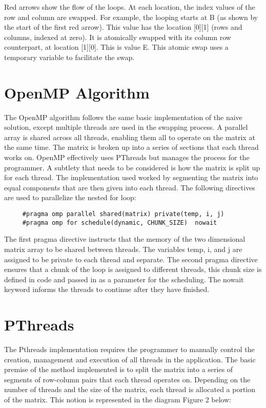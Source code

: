 \documentclass[10pt,onecolumn]{article}
\begin{document}
    \noindent Red arrows show the flow of the loops. At each location, the index values of the row and column are swapped. For example, the looping starts at B (as shown by the start of the first red arrow). This value has the location [0][1] (rows and columns, indexed at zero). It is atomically swapped with its column row counterpart, at location [1][0]. This is value E. This atomic swap uses a temporary variable to facilitate the swap.
    
    \section{OpenMP Algorithm}
    The OpenMP algorithm follows the same basic implementation of the naive solution, except multiple threads are used in the swapping process. A parallel array is shared across all threads, enabling them all to operate on the matrix at the same time. The matrix is broken up into a series of sections that each thread works on. OpenMP effectively uses PThreads but manages the process for the programmer. A subtlety that needs to be considered is how the matrix is split up for each thread. The implementation used worked by segmenting the matrix into equal components that are then given into each thread. The following directives are used to parallelize the nested for loop: 
    
    \begin{verbatim}
     #pragma omp parallel shared(matrix) private(temp, i, j)
     #pragma omp for schedule(dynamic, CHUNK_SIZE)  nowait
    \end{verbatim}
    
    \noindent The first pragma directive instructs that the memory of the two dimensional matrix array to be shared between threads. The variables temp, i, and j are assigned to be private to each thread and separate. The second pragma directive ensures that a chunk of the loop is assigned to different threads, this chunk size is defined in code and passed in as a parameter for the scheduling. The nowait keyword informs the threads to continue after they have finished.
    
    \section{PThreads}
    The Pthreads implementation requires the programmer to manually control the creation, management and execution of all threads in the application. The basic premise of the method implemented is to split the matrix into a series of segments of row-column pairs that each thread operates on. Depending on the number of threads and the size of the matrix, each thread is allocated a portion of the matrix.  This notion is represented in the diagram Figure 2 below: \\
    
\end{document}
